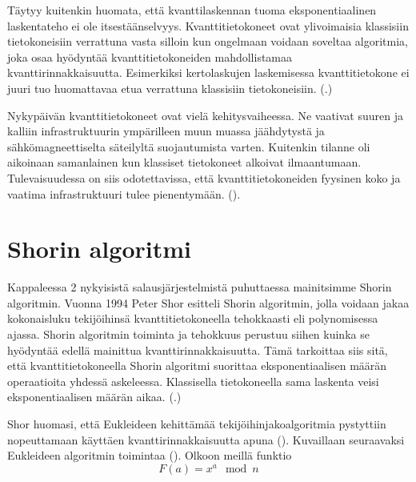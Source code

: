 Täytyy kuitenkin huomata, että kvanttilaskennan tuoma eksponentiaalinen laskentateho ei ole itsestäänselvyys. Kvanttitietokoneet ovat ylivoimaisia klassisiin tietokoneisiin verrattuna vasta silloin kun ongelmaan voidaan soveltaa algoritmia, joka osaa hyödyntää kvanttitietokoneiden mahdollistamaa kvanttirinnakkaisuutta. Esimerkiksi kertolaskujen laskemisessa kvanttitietokone ei juuri tuo huomattavaa etua verrattuna klassisiin tietokoneisiin. (\cite{mavroeidis2018impact}.)

Nykypäivän kvanttitietokoneet ovat vielä kehitysvaiheessa. Ne vaativat suuren ja kalliin infrastruktuurin ympärilleen muun muassa jäähdytystä ja sähkömagneettiselta säteilyltä suojautumista varten. Kuitenkin tilanne oli aikoinaan samanlainen kun klassiset tietokoneet alkoivat ilmaantumaan. Tulevaisuudessa on siis odotettavissa, että kvanttitietokoneiden fyysinen koko ja vaatima infrastruktuuri tulee pienentymään. (\cite{doi:10.1080/23742917.2016.1226650}).

\section{Shorin algoritmi}
Kappaleessa 2 nykyisistä salausjärjestelmistä puhuttaessa mainitsimme Shorin algoritmin. Vuonna 1994 Peter Shor esitteli Shorin algoritmin, jolla voidaan jakaa kokonaisluku tekijöihinsä kvanttitietokoneella tehokkaasti eli polynomisessa ajassa. Shorin algoritmin toiminta ja tehokkuus perustuu siihen kuinka se hyödyntää edellä mainittua kvanttirinnakkaisuutta. Tämä tarkoittaa siis sitä, että kvanttitietokoneella Shorin algoritmi suorittaa eksponentiaalisen määrän operaatioita yhdessä askeleessa. Klassisella tietokoneella sama laskenta veisi eksponentiaalisen määrän aikaa. (\cite{hayward2008quantum}.)

Shor huomasi, että Eukleideen kehittämää tekijöihinjakoalgoritmia pystyttiin nopeuttamaan käyttäen kvanttirinnakkaisuutta apuna (\cite{doi:10.1080/23742917.2016.1226650}). Kuvaillaan seuraavaksi Eukleideen algoritmin toimintaa (\cite{hayward2008quantum}). Olkoon meillä funktio
\begin{equation}
    \label{eq1}
    F(a) = x^{a} \mod n
\end{equation}

